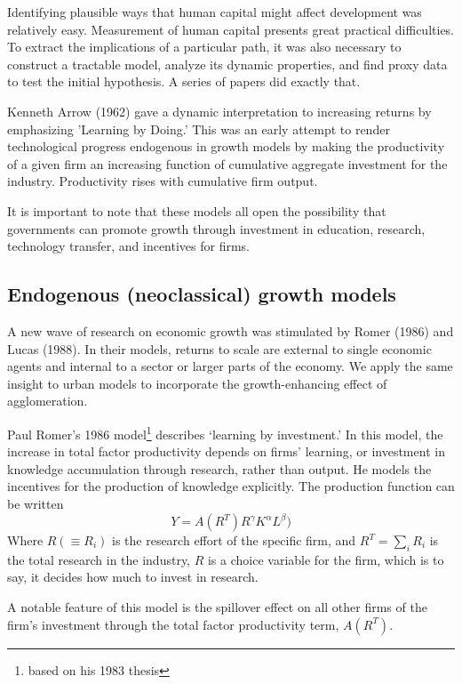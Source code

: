 Identifying  plausible ways that human capital might affect development was relatively easy. Measurement of human capital presents great practical difficulties. To extract the implications of a particular path, it was also necessary to construct a tractable model, analyze its dynamic properties, and find proxy data to test the initial hypothesis.   A series of papers did exactly that.

Kenneth Arrow (1962) gave a dynamic interpretation to increasing returns by emphasizing 'Learning by Doing.' This was an early attempt to render technological progress endogenous in growth models by making the productivity of a given firm an increasing function of cumulative aggregate investment for the industry. Productivity rises with cumulative firm output.

It is important to note that these models all open the possibility that governments can  promote growth through investment in education, research, technology transfer, and incentives for firms.

\subsection{Endogenous (neoclassical) growth models}
A new wave of research on economic growth was stimulated by Romer (1986) and Lucas (1988). In their models, returns to scale are external to single economic agents and internal to a sector or larger parts of the economy. We apply the same insight to urban models to incorporate the growth-enhancing effect of agglomeration. 


Paul Romer's 1986  model\footnote{ based on his 1983 thesis} describes `learning by investment.' In this model, the increase in {total factor productivity} depends on firms' learning, or investment in knowledge accumulation through research, rather than output. He models the incentives for the production of knowledge explicitly. The production function  can be written
\[Y = A(R^T)R^\gamma  K^\alpha L^\beta) \]
Where $R(\equiv R_i)$ is the research effort of the specific firm, and $R^T=\sum_iR_i$ is the total research in the industry,  $R$ is a choice variable for the firm, which is to say, it decides how much to invest in research. 

A notable feature of this model is the spillover effect on all other firms of the firm's investment through the \gls{total factor productivity} term,  $A(R^T)$. %

